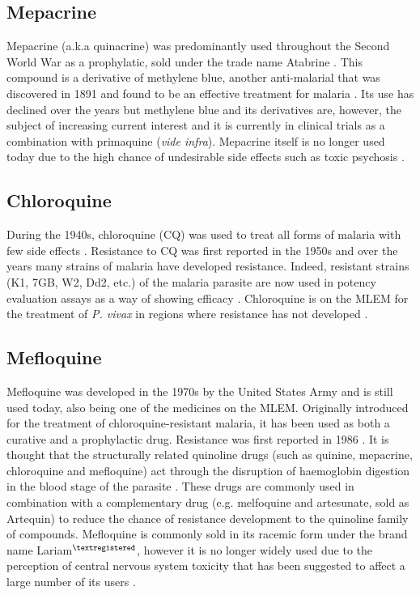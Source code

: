 \documentclass[twocolumn]{bmcart}%
\begin{document}
\subsection*{Mepacrine}
Mepacrine (a.k.a quinacrine) was predominantly used throughout the Second World War as a prophylatic, sold under the trade name Atabrine \cite{Green1932}. This compound is a derivative of methylene blue, another anti-malarial that was discovered in 1891 and found to be an effective treatment for malaria \cite{Guttman1891,Schirmer2003}. Its use has declined over the years but methylene blue and its derivatives are, however, the subject of increasing current interest \cite{Lu2018} and it is currently in clinical trials as a combination with primaquine (\textit{vide infra}). Mepacrine itself is no longer used today due to the high chance of undesirable side effects such as toxic psychosis \cite{Weina1998}.

\subsection*{Chloroquine}
During the 1940s, chloroquine (CQ) was used to treat all forms of malaria with few side effects \cite{Loeb1946}. Resistance to CQ was first reported in the 1950s and over the years many strains of malaria have developed resistance. Indeed, resistant strains (K1, 7GB, W2, Dd2, etc.) of the malaria parasite are now used in potency evaluation assays as a way of showing efficacy \cite{Mushtaque2015}. Chloroquine is on the MLEM for the treatment of \textit{P. vivax} in regions where resistance has not developed \cite{MLEM}.

\subsection*{Mefloquine}
Mefloquine was developed in the 1970s by the United States Army \cite{Trenholme1975} and is still used today, also being one of the medicines on the MLEM. Originally introduced for the treatment of chloroquine-resistant malaria, it has been used as both a curative and a prophylactic drug. Resistance was first reported in 1986 \cite{Brasseur1986}. It is thought that the structurally related quinoline drugs (such as quinine, mepacrine, chloroquine and mefloquine) act through the disruption of haemoglobin digestion in the blood stage of the parasite \cite{Foley1997}. These drugs are commonly used in combination with a complementary drug (e.g. melfoquine and artesunate, sold as Artequin\texttrademark) to reduce the chance of resistance development to the quinoline family of compounds. Mefloquine is commonly sold in its racemic form under the brand name Lariam$^{\scriptsize{\textregistered}}$, however it is no longer widely used due to the perception of central nervous system toxicity that has been suggested to affect a large number of its users \cite{Nevin2016}.
\end{document}

